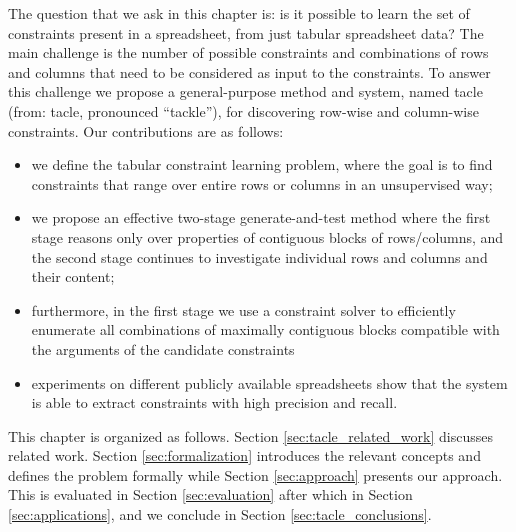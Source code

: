 The question that we ask in this chapter is: is it possible to learn the set of constraints present in a spreadsheet, from just tabular spreadsheet data? The main challenge is the number of possible constraints and combinations of rows and columns that need to be considered as input to the constraints.
To answer this challenge we propose a general-purpose method and system, named \acrshort{tacle} (from: \acrlong{tacle}, pronounced ``tackle''), for discovering row-wise and column-wise constraints. 
%
Our contributions are as follows:
\begin{itemize}
\item we define the tabular constraint learning problem, where the goal is to find constraints that range over entire rows or columns in an unsupervised way;
\item we propose an effective two-stage generate-and-test method where the first stage reasons only over properties of contiguous blocks of rows/columns, and the second stage continues to investigate individual rows and columns and their content;
\item furthermore, in the first stage we use a constraint solver to efficiently enumerate all combinations of maximally contiguous blocks compatible with the arguments of the candidate constraints %
\item experiments on different publicly available spreadsheets show that the system is able to extract constraints with high precision and recall.
\end{itemize}



This chapter is organized as follows.
Section \ref{sec:tacle_related_work} discusses related work. Section \ref{sec:formalization} introduces the relevant concepts and defines the problem formally while Section \ref{sec:approach} presents our approach. This is evaluated in Section \ref{sec:evaluation} after which  in Section \ref{sec:applications}, and we conclude in Section \ref{sec:tacle_conclusions}.

